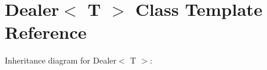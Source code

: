 \hypertarget{class_dealer}{}\section{Dealer$<$ T $>$ Class Template Reference}
\label{class_dealer}


Inheritance diagram for Dealer$<$ T $>$\+:

